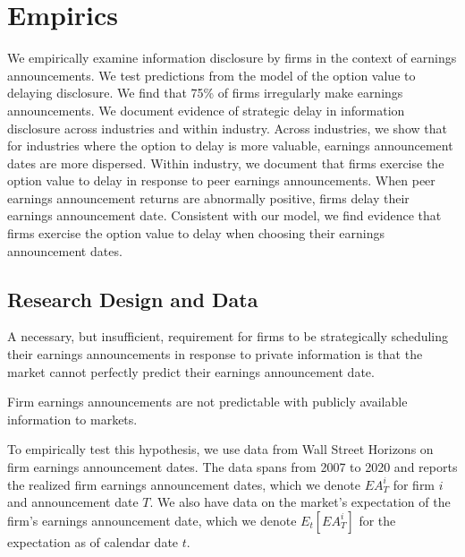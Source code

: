 \documentclass[authoryear,letterpaper,english,12pt]{elsarticle}
\begin{document}
\section{Empirics}

We empirically examine information disclosure by firms in the context of earnings announcements. We test predictions from the model of the option value to delaying disclosure. We find that 75\% of firms irregularly make earnings announcements. We document evidence of strategic delay in information disclosure across industries and within industry. Across industries, we show that for industries where the option to delay is more valuable, earnings announcement dates are more dispersed. Within industry, we document that firms exercise the option value to delay in response to peer earnings announcements. When peer earnings announcement returns are abnormally positive, firms delay their earnings announcement date. Consistent with our model, we find evidence that firms exercise the option value to delay when choosing their earnings announcement dates. 

\subsection{Research Design and Data}\label{ss:researchdesign}

A necessary, but insufficient, requirement for firms to be strategically scheduling their earnings announcements in response to private information is that the market cannot perfectly predict their earnings announcement date. 

\begin{hypothesis}\label{hyp:surprisingdates}
Firm earnings announcements are not predictable with publicly available information to markets. 
\end{hypothesis}
To empirically test this hypothesis, we use data from Wall Street Horizons on firm earnings announcement dates. The data spans from 2007 to 2020 and reports the realized firm earnings announcement dates, which we denote $EA^{i}_{T}$ for firm $i$ and announcement date $T$. We also have data on the market's expectation of the firm's earnings announcement date, which we denote $E_{t}[EA^{i}_{T}]$ for the expectation as of calendar date $t$.  
\end{document}
